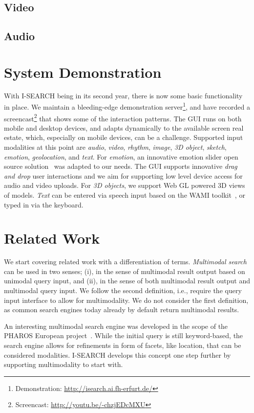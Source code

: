 \documentclass{acm_proc_article-sp}
\let\oldemph\emph
\renewcommand{\emph}[1]{\oldemph{\fontsize{9}{9}\selectfont #1}}
\newcommand{\inlinelistingsize}{\fontsize{8pt}{11pt}}
\let\oldurl\url
\renewcommand{\url}[1]{\inlinelistingsize\oldurl{#1}}
\begin{document}
\subsection{Video}


\subsection{Audio}


\section{System Demonstration} \label{sec:systemdemonstration}
With \mbox{I-SEARCH} being in its second year, there is now some basic functionality in place.
We maintain a bleeding-edge demonstration server\footnote{Demonstration: \url{http://isearch.ai.fh-erfurt.de/}}, and have recorded a screencast\footnote{Screencast: \url{http://youtu.be/-chzjEDcMXU}} that shows some of the interaction patterns.
The GUI runs on both mobile and desktop devices, and adapts dynamically to the available screen real estate, which, especially on mobile devices, can be a challenge.
Supported input modalities at this point are \emph{audio}, \emph{video}, \emph{rhythm}, \emph{image}, \emph{3D object}, \emph{sketch}, \emph{emotion}, \emph{geolocation}, and \emph{text}.
For \emph{emotion}, an innovative emotion slider open source solution~\cite{emotionslider} was adapted to our needs.
The GUI supports innovative \textit{drag and drop} user interactions and we aim for supporting low level device access for audio and video uploads.
For \emph{3D objects}, we support Web GL powered 3D views of models.
\emph{Text} can be entered via speech input based on the WAMI toolkit~\cite{wami}, or typed in via the keyboard.

\section{Related Work} \label{sec:relatedwork}
We start covering related work with a differentiation of terms.
\emph{Multimodal search} can be used in two senses; (i), in the sense of multimodal result output based on unimodal query input, and (ii), in the sense of both multimodal result output and multimodal query input.
We follow the second definition, i.e., require the query input interface to allow for multimodality.
We do not consider the first definition, as common search engines today already by default return multimodal results.

An interesting multimodal search engine was developed in the scope of the PHAROS European project~\cite{pharos2008}. While the initial query is still keyword-based, the search engine allows for refinements in form of facets, like location, that can be considered modalities.
\mbox{I-SEARCH} develops this concept one step further by supporting multimodality to start with.
\end{document}
